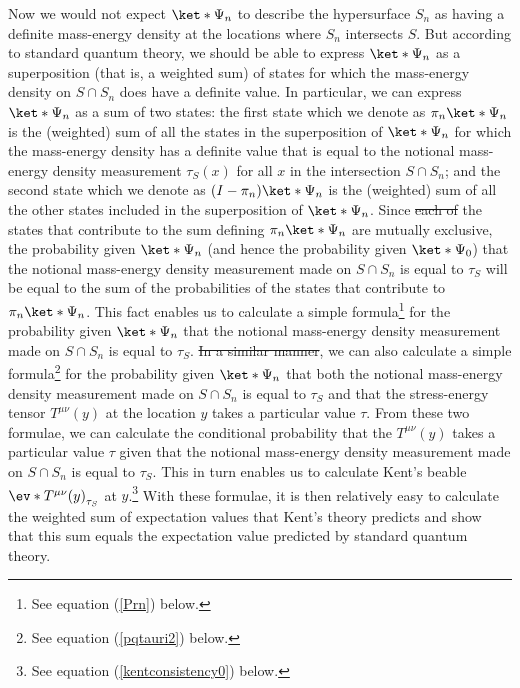\documentclass[12pt]{report}
\providecommand{\DIFadd}[1]{{\protect\color{blue}\uwave{#1}}} %
\providecommand{\DIFdel}[1]{{\protect\color{red}\sout{#1}}}                      %
\providecommand{\DIFaddbegin}{} %
\providecommand{\DIFaddend}{} %
\providecommand{\DIFdelbegin}{} %
\providecommand{\DIFdelend}{} %
\begin{document}
Now we would not expect $\ket*{\Psi_n}$ to describe the hypersurface $S_n$ as having a definite mass-energy density at the locations where $S_n$ intersects $S$. But according to standard quantum theory, we should be able to express $\ket*{\Psi_n}$ as a superposition (that is, a weighted sum) of states for which the mass-energy density on $S\cap S_n$ does have a definite value. In particular, we can express $\ket*{\Psi_n}$ as a sum of two states: the first state which we denote as $\pi_n \ket*{\Psi_n}$ \label{overviewpi}
is the (weighted) sum of all the states in the superposition of $\ket*{\Psi_n}$ for which the mass-energy density has a definite value that is equal to the notional mass-energy density measurement $\tau_S(x)$ for all $x$ in the intersection $S\cap S_n$; and the second state which we denote as $(I- \pi_n) \ket*{\Psi_n}$ is the (weighted) sum of all the other states included in the superposition of $\ket*{\Psi_n}$. Since \DIFdelbegin \DIFdel{each of }\DIFdelend \DIFaddbegin \DIFadd{all }\DIFaddend the states that contribute to the sum defining $\pi_n \ket*{\Psi_n}$ are mutually exclusive, the probability given $\ket*{\Psi_n}$ (and hence  the probability given $\ket*{\Psi_0}$) that the notional mass-energy density measurement made on $S\cap S_n$ is equal to $\tau_S$ will be equal to the sum of the probabilities of the states that contribute to $\pi_n \ket*{\Psi_n}$. This fact enables us to calculate a simple formula\footnote{See equation (\ref{Prn}) below.} for the probability given $\ket*{\Psi_n}$ that the notional mass-energy density measurement made on $S\cap S_n$ is equal to $\tau_S$. \DIFdelbegin \DIFdel{In a similar manner}\DIFdelend \DIFaddbegin \DIFadd{Similarly}\DIFaddend , we can also calculate a simple formula\footnote{See equation (\ref{pqtauri2}) below.} for the probability given $\ket*{\Psi_n}$ that both the notional mass-energy density measurement made on $S\cap S_n$ is equal to $\tau_S$ and that the stress-energy tensor $T^{\mu\nu}(y)$ at the location $y$ takes a particular value $\tau$. %
%
 From these two formulae, we can calculate the conditional probability that the $T^{\mu\nu}(y)$ takes a particular value $\tau$ given that the notional mass-energy density measurement made on $S\cap S_n$ is equal to $\tau_S$. This in turn enables us to calculate Kent's beable $\ev*{T^{\mu\nu}(y)}_{\tau_S}$ at $y$.\footnote{See equation (\ref{kentconsistency0}) below.} With these formulae, it is then relatively easy to calculate the weighted sum of expectation values that Kent's theory predicts and show that this sum equals the expectation value predicted by standard quantum theory.
\end{document}
